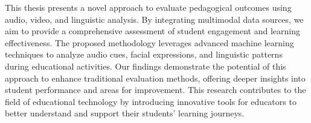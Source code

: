 \newpage
{}

This thesis presents a novel approach to evaluate pedagogical outcomes using audio, video, and linguistic analysis. By integrating multimodal data sources, we aim to provide a comprehensive assessment of student engagement and learning effectiveness. The proposed methodology leverages advanced machine learning techniques to analyze audio cues, facial expressions, and linguistic patterns during educational activities. Our findings demonstrate the potential of this approach to enhance traditional evaluation methods, offering deeper insights into student performance and areas for improvement. This research contributes to the field of educational technology by introducing innovative tools for educators to better understand and support their students' learning journeys.